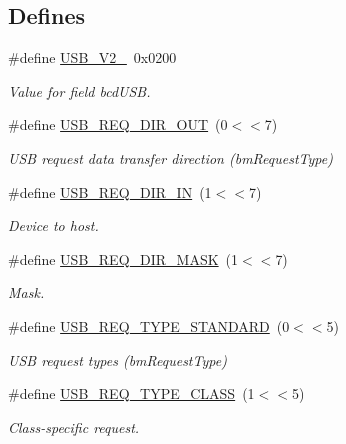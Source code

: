 \subsection*{\-Defines}
\begin{DoxyCompactItemize}
\item 
\#define \hyperlink{group__usb__protocol__group_ga9bccec980a4f41a481b389b4f0c9c690}{\-U\-S\-B\-\_\-\-V2\-\_}~0x0200
\begin{DoxyCompactList}\small\item\em \-Value for field bcd\-U\-S\-B. \end{DoxyCompactList}\item 
\#define \hyperlink{group__usb__protocol__group_ga3fae7189eea003bf79ac2949b0f50584}{\-U\-S\-B\-\_\-\-R\-E\-Q\-\_\-\-D\-I\-R\-\_\-\-O\-U\-T}~(0$<$$<$7)
\begin{DoxyCompactList}\small\item\em \-U\-S\-B request data transfer direction (bm\-Request\-Type) \end{DoxyCompactList}\item 
\#define \hyperlink{group__usb__protocol__group_ga3d3c24265f68a720887ae4ff7158d605}{\-U\-S\-B\-\_\-\-R\-E\-Q\-\_\-\-D\-I\-R\-\_\-\-I\-N}~(1$<$$<$7)
\begin{DoxyCompactList}\small\item\em \-Device to host. \end{DoxyCompactList}\item 
\#define \hyperlink{group__usb__protocol__group_gac94f5ec9106e17f2e6d927eeac3d530f}{\-U\-S\-B\-\_\-\-R\-E\-Q\-\_\-\-D\-I\-R\-\_\-\-M\-A\-S\-K}~(1$<$$<$7)
\begin{DoxyCompactList}\small\item\em \-Mask. \end{DoxyCompactList}\item 
\#define \hyperlink{group__usb__protocol__group_ga3eb781776ab6dcbc6fa96e1b0ed18011}{\-U\-S\-B\-\_\-\-R\-E\-Q\-\_\-\-T\-Y\-P\-E\-\_\-\-S\-T\-A\-N\-D\-A\-R\-D}~(0$<$$<$5)
\begin{DoxyCompactList}\small\item\em \-U\-S\-B request types (bm\-Request\-Type) \end{DoxyCompactList}\item 
\#define \hyperlink{group__usb__protocol__group_gaff9ee0044c6cb131b2908356adc37dff}{\-U\-S\-B\-\_\-\-R\-E\-Q\-\_\-\-T\-Y\-P\-E\-\_\-\-C\-L\-A\-S\-S}~(1$<$$<$5)
\begin{DoxyCompactList}\small\item\em \-Class-\/specific request. \end{DoxyCompactList}\item 
$$
\end{DoxyCompactItemize}
